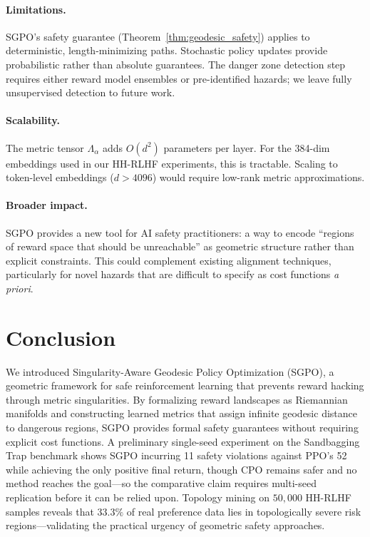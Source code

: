 \documentclass{article}
\begin{document}
\paragraph{Limitations.} SGPO's safety guarantee (Theorem~\ref{thm:geodesic_safety}) applies to deterministic, length-minimizing paths. Stochastic policy updates provide probabilistic rather than absolute guarantees. The danger zone detection step requires either reward model ensembles or pre-identified hazards; we leave fully unsupervised detection to future work.

\paragraph{Scalability.} The metric tensor $\Lambda_\alpha$ adds $O(d^2)$ parameters per layer. For the 384-dim embeddings used in our HH-RLHF experiments, this is tractable. Scaling to token-level embeddings ($d > 4096$) would require low-rank metric approximations.

\paragraph{Broader impact.} SGPO provides a new tool for AI safety practitioners: a way to encode ``regions of reward space that should be unreachable'' as geometric structure rather than explicit constraints. This could complement existing alignment techniques, particularly for novel hazards that are difficult to specify as cost functions \emph{a priori}.

\section{Conclusion}
\label{sec:conclusion}

We introduced Singularity-Aware Geodesic Policy Optimization (SGPO), a geometric framework for safe reinforcement learning that prevents reward hacking through metric singularities. By formalizing reward landscapes as Riemannian manifolds and constructing learned metrics that assign infinite geodesic distance to dangerous regions, SGPO provides formal safety guarantees without requiring explicit cost functions. A preliminary single-seed experiment on the Sandbagging Trap benchmark shows SGPO incurring 11 safety violations against PPO's 52 while achieving the only positive final return, though CPO remains safer and no method reaches the goal---so the comparative claim requires multi-seed replication before it can be relied upon. Topology mining on $50{,}000$ HH-RLHF samples reveals that $33.3\%$ of real preference data lies in topologically severe risk regions---validating the practical urgency of geometric safety approaches.
\end{document}
